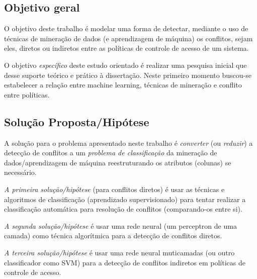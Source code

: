 \subsection{Objetivo geral}\label{objetivo_geral}
O objetivo deste trabalho é modelar uma forma de detectar, mediante o uso de técnicas de mineração de dados (e aprendizagem de máquina) os conflitos, sejam eles, diretos ou indiretos entre as políticas de controle de acesso de um sistema. 

O objetivo \textit{específico} deste estudo orientado é realizar uma pesquisa inicial que desse suporte teórico e prático à dissertação. Neste primeiro momento buscou-se estabelecer a relação entre machine learning, técnicas de mineração e conflito entre políticas.

\subsection{Solução Proposta/Hipótese}\label{solucao_proposta}
A solução para o problema apresentado neste trabalho é \textit{converter} (ou \textit{reduzir}) a detecção de conflitos a um \textit{problema de classificação} da mineração de dados/aprendizagem de máquina reestruturando os atributos (colunas) se necessário. 

\textit{A primeira solução/hipótese} (para conflitos diretos) é usar as técnicas e algoritmos de classificação (aprendizado supervisionado) para tentar realizar a classificação automática para resolução de conflitos (comparando-os entre si). 

\textit{A segunda solução/hipótese} é usar uma rede neural (um perceptron de uma camada) como técnica algorítmica para a detecção de conflitos diretos. 

\textit{A terceira solução/hipótese} é usar uma rede neural muticamadas (ou outro classificador como SVM) para a detecção de conflitos indiretos em políticas de controle de acesso.
 